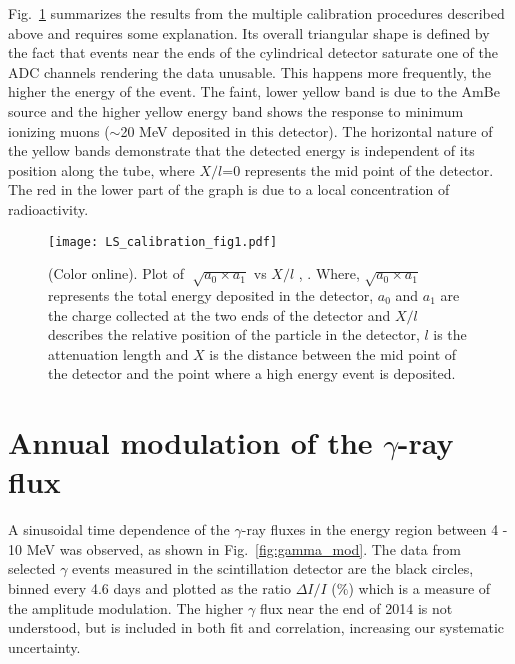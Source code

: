 \documentclass[aps,prc,showpacs,twocolumn,superscriptaddress]{revtex4-1}
\begin{document}
Fig.~\ref{fig:calibration} summarizes the results from the multiple calibration procedures described above and requires some explanation. Its overall triangular shape is defined by the fact that events near the ends of the cylindrical detector saturate one of the ADC channels rendering the data unusable.  This happens more frequently, the higher the energy of the event.  The faint, lower yellow band is due to the AmBe source and the higher yellow energy band shows the response to minimum ionizing muons ($\sim$20 MeV deposited in this detector).  The horizontal nature of the yellow bands demonstrate that the detected energy is independent of its position along the tube, where $X/l$=0 represents the mid point of the detector. The red in the lower part of the graph is due to a local concentration of radioactivity.
\begin{figure} [H]
\centering
\texttt{[image: LS\_calibration\_fig1.pdf]}
\caption {(Color online). Plot of $\sqrt[]{a_{0}\times a_{1}}$ vs $X/l$ \cite{mei}, \cite{cmei}. Where, $ \sqrt{a_{0}\times a_{1}}$ represents the total energy deposited in the detector, $a_{0}$ and $a_{1}$ are the charge collected at the two ends of the detector and $X/l$ describes the relative position of the particle in the detector, $l$ is the attenuation length and $X$ is the distance between the mid point of the detector and the point where a high energy event is deposited.}
\label{fig:calibration}
\end{figure}
\section{Annual modulation of the $\gamma$-ray flux}
A sinusoidal time dependence of the $\gamma$-ray fluxes in the energy region between 4 - 10 MeV was observed, as shown in Fig.~\ref{fig:gamma_mod}. The data from selected $\gamma$ events measured in the scintillation detector are the black circles, binned every 4.6 days and plotted as the ratio $\Delta$$I/I$ ($\%$) which  is a measure of the amplitude modulation. The higher $\gamma$ flux near the end of 2014 is not understood, but is included in both fit and correlation, increasing our systematic uncertainty.
\end{document}

